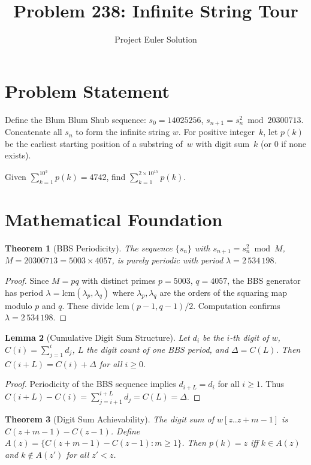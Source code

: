 \documentclass[12pt]{article}
\title{Problem 238: Infinite String Tour}
\author{Project Euler Solution}
\date{}
\newtheorem{theorem}{Theorem}
\newtheorem{lemma}[theorem]{Lemma}
\begin{document}
\maketitle

\section{Problem Statement}
Define the Blum Blum Shub sequence: $s_0 = 14025256$, $s_{n+1} = s_n^2 \bmod 20300713$. Concatenate all $s_n$ to form the infinite string $w$. For positive integer~$k$, let $p(k)$ be the earliest starting position of a substring of~$w$ with digit sum~$k$ (or $0$ if none exists).

Given $\sum_{k=1}^{10^3} p(k) = 4742$, find $\sum_{k=1}^{2 \times 10^{15}} p(k)$.

\section{Mathematical Foundation}

\begin{theorem}[BBS Periodicity]
The sequence $\{s_n\}$ with $s_{n+1} = s_n^2 \bmod M$, $M = 20300713 = 5003 \times 4057$, is purely periodic with period $\lambda = 2\,534\,198$.
\end{theorem}

\begin{proof}
Since $M = pq$ with distinct primes $p = 5003$, $q = 4057$, the BBS generator has period $\lambda = \mathrm{lcm}(\lambda_p, \lambda_q)$ where $\lambda_p, \lambda_q$ are the orders of the squaring map modulo $p$ and $q$. These divide $\mathrm{lcm}(p{-}1, q{-}1)/2$. Computation confirms $\lambda = 2\,534\,198$.
\end{proof}

\begin{lemma}[Cumulative Digit Sum Structure]
Let $d_i$ be the $i$-th digit of $w$, $C(i) = \sum_{j=1}^{i} d_j$, $L$ the digit count of one BBS period, and $\Delta = C(L)$. Then $C(i+L) = C(i) + \Delta$ for all $i \geq 0$.
\end{lemma}

\begin{proof}
Periodicity of the BBS sequence implies $d_{i+L} = d_i$ for all $i \geq 1$. Thus $C(i+L) - C(i) = \sum_{j=i+1}^{i+L} d_j = C(L) = \Delta$.
\end{proof}

\begin{theorem}[Digit Sum Achievability]
The digit sum of $w[z..z{+}m{-}1]$ is $C(z{+}m{-}1) - C(z{-}1)$. Define $A(z) = \{C(z{+}m{-}1) - C(z{-}1) : m \geq 1\}$. Then $p(k) = z$ iff $k \in A(z)$ and $k \notin A(z')$ for all $z' < z$.
\end{theorem}
\end{document}
